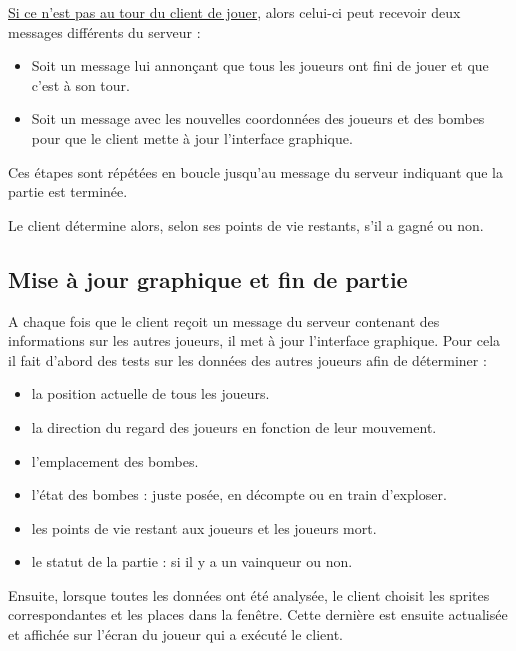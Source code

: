 \vspace{0.5cm}

\underline{Si ce n'est pas au tour du client de jouer}, alors celui-ci peut recevoir deux messages différents du serveur :
\begin{itemize}
	\item Soit un message lui annonçant que tous les joueurs ont fini de jouer et que c'est à son tour.
	\item Soit un message avec les nouvelles coordonnées des joueurs et des bombes pour que le client mette à jour l'interface graphique.\\
\end{itemize}

Ces étapes sont répétées en boucle jusqu'au message du serveur indiquant que la partie est terminée.

Le client détermine alors, selon ses points de vie restants, s'il a gagné ou non.

\subsection*{Mise à jour graphique et fin de partie}

A chaque fois que le client reçoit un message du serveur contenant des informations sur les autres joueurs, il met à jour l'interface graphique. Pour cela il fait d'abord des tests sur les données des autres joueurs afin de déterminer :
\begin{itemize}
	\item la position actuelle de tous les joueurs.
	\item la direction du regard des joueurs en fonction de leur mouvement.
	\item l'emplacement des bombes.
	\item l'état des bombes : juste posée, en décompte ou en train d'exploser.
	\item les points de vie restant aux joueurs et les joueurs mort.
	\item le statut de la partie : si il y a un vainqueur ou non.
\end{itemize}

\vspace{0.5cm}

Ensuite, lorsque toutes les données ont été analysée, le client choisit les sprites correspondantes et les places dans la fenêtre. Cette dernière est ensuite actualisée et affichée sur l'écran du joueur qui a exécuté le client. 
